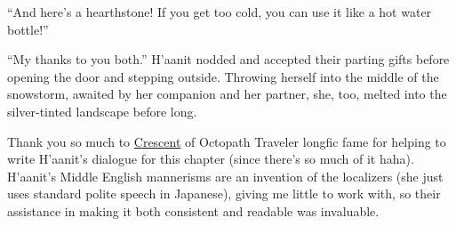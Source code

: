 ``And here's a hearthstone! If you get too cold, you can use it like a hot water bottle!''

``My thanks to you both.'' H'aanit nodded and accepted their parting gifts before opening the door and stepping outside. Throwing herself into the middle of the snowstorm, awaited by her companion and her partner, she, too, melted into the silver-tinted landscape before long.

\printendnotes

Thank you so much to \href{https://twitter.com/__digitaldreams}{Crescent} of Octopath Traveler longfic fame for helping to write H'aanit's dialogue for this chapter (since there's so much of it haha). H'aanit's Middle English mannerisms are an invention of the localizers (she just uses standard polite speech in Japanese), giving me little to work with, so their assistance in making it both consistent and readable was invaluable.